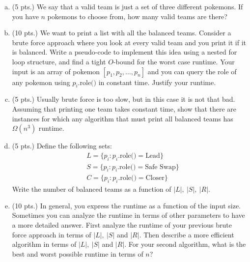 \documentclass[letterpaper,11pt]{article}
\theoremstyle{plain}
\theoremstyle{definition}
\begin{document}
\begin{enumerate}[a)]
    \item (5 pts.) We say that a valid team is just a set of three different pokemons. If you have $n$ pokemons to choose from, how many valid teams are there? \\
    \color{blue}
    \color{black}
    \item (10 pts.) We want to print a list with all the balanced teams. Consider a brute force approach where you look at every valid team and you print it if it is balanced. Write a pseudo-code to implement this idea using a nested for loop structure, and find a tight $O$-bound for the worst case runtime. Your input is an array of pokemon $[p_1,p_2,\ldots,p_n]$ and you can query the role of any pokemon using $p_i.\text{role()}$ in constant time. Justify your runtime. \\
    \color{blue}
    \color{black}
    \item (5 pts.) Usually brute force is too slow, but in this case it is not that bad. Assuming that printing one team takes constant time, show that there are instances for which any algorithm that must print all balanced teams has $\Omega(n^3)$ runtime. \\
    \color{blue}
    \color{black}
    \item (5 pts.) Define the following sets:
    \begin{align*}
        &L= \{p_i : p_i.\text{role()} = \text{Lead}\} \\
        &S= \{p_i : p_i.\text{role()} = \text{Safe Swap}\} \\
        &C= \{p_i : p_i.\text{role()} = \text{Closer}\} 
    \end{align*}
    Write the number of balanced teams as a function of $|L|, \ |S|, \ |R|$. \\
     \color{blue}
    \color{black}
    \item (10 pts.) In general, you express the runtime as a function of the input size. Sometimes you can analyze the runtime in terms of other parameters to have a more detailed answer. First analyze the runtime of your previous brute force approach in terms of $|L|, \ |S|$ and $|R|$. Then describe a more efficient algorithm in terms of $|L|, \ |S|$ and $|R|$. For your second algorithm, what is the best and worst possible runtime in terms of $n$?  
     \color{blue}
    \color{black}
\end{enumerate}
\newpage
\end{document}
